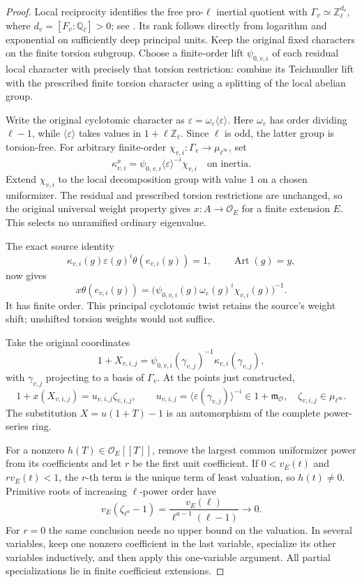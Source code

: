 \begin{proof}
Local reciprocity identifies the free pro-\(\ell\) inertial quotient
with \(\Gamma_v\simeq\mathbb Z_\ell^{d_v}\), where
\(d_v=[F_v:\mathbb Q_\ell]>0\); see
\cite{MilneClassicalControl}.  Its rank follows directly from
logarithm and exponential on sufficiently deep principal units.
Keep the original fixed characters on the finite torsion subgroup.
Choose a finite-order lift \(\psi_{0,v,i}\) of each residual local
character with precisely that torsion restriction: combine its
Teichmuller lift with the prescribed finite torsion character using
a splitting of the local abelian group.

Write the original cyclotomic character as
\(\varepsilon=\omega_\varepsilon\langle\varepsilon\rangle\).
Here \(\omega_\varepsilon\) has order dividing \(\ell-1\), while
\(\langle\varepsilon\rangle\) takes values in
\(1+\ell\mathbb Z_\ell\).  Since \(\ell\) is odd, the latter group
is torsion-free.  For arbitrary finite-order
\(\chi_{v,i}:\Gamma_v\to\mu_{\ell^\infty}\), set
\[
 \kappa_{v,i}^x
    =\psi_{0,v,i}\langle\varepsilon\rangle^{-i}\chi_{v,i}
       \quad\text{on inertia}.
\]
Extend \(\chi_{v,i}\) to the local decomposition group with value
\(1\) on a chosen uniformizer.  The residual and prescribed torsion
restrictions are unchanged, so the original universal weight
property gives \(x:A\to\mathcal O_E\) for a finite extension \(E\).
This selects no unramified ordinary eigenvalue.

The exact source identity
\[
 \kappa_{v,i}(g)\varepsilon(g)^i\theta(e_{v,i}(y))=1,
 \qquad\operatorname{Art}(g)=y,
\]
now gives
\[
 x\theta(e_{v,i}(y))
   =\bigl(\psi_{0,v,i}(g)\omega_\varepsilon(g)^i
                       \chi_{v,i}(g)\bigr)^{-1}.
\]
It has finite order.  This principal cyclotomic twist retains the
source's weight shift; unshifted torsion weights would not suffice.

Take the original coordinates
\[
 1+X_{v,i,j}
   =\psi_{0,v,i}(\gamma_{v,j})^{-1}
                 \kappa_{v,i}(\gamma_{v,j}),
\]
with \(\gamma_{v,j}\) projecting to a basis of \(\Gamma_v\).
At the points just constructed,
\[
 1+x(X_{v,i,j})=u_{v,i,j}\zeta_{v,i,j},\qquad
 u_{v,i,j}=\langle\varepsilon(\gamma_{v,j})\rangle^{-i}
     \in1+\mathfrak m_{\mathcal O},\quad
 \zeta_{v,i,j}\in\mu_{\ell^\infty}.
\]
The substitution \(X=u(1+T)-1\) is an automorphism of the complete
power-series ring.

For a nonzero \(h(T)\in\mathcal O_E[[T]]\), remove the largest common
uniformizer power from its coefficients and let \(r\) be the first
unit coefficient.  If \(0<v_E(t)\) and \(rv_E(t)<1\), the \(r\)-th
term is the unique term of least valuation, so \(h(t)\ne0\).
Primitive roots of increasing \(\ell\)-power order have
\[
 v_E(\zeta_{\ell^a}-1)
   =\frac{v_E(\ell)}{\ell^{a-1}(\ell-1)}\longrightarrow0.
\]
For \(r=0\) the same conclusion needs no upper bound on the valuation.
In several variables, keep one nonzero coefficient in the last
variable, specialize its other variables inductively, and then
apply this one-variable argument.  All partial specializations lie
in finite coefficient extensions.


\end{proof}
